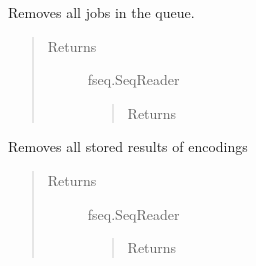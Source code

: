 \documentclass[letterpaper,10pt,english]{sphinxmanual}
\begin{document}
\begin{fulllineitems}
\begin{fulllineitems}
\end{fulllineitems}


\begin{fulllineitems}
\label{fseq.reading:fseq.reading.seq_reader.SeqReader.clearJobQueue}
Removes all jobs in the queue.
\begin{quote}\begin{description}
\item[{Returns}] \leavevmode
fseq.SeqReader
\begin{quote}

Returns 
\end{quote}

\end{description}\end{quote}

\end{fulllineitems}


\begin{fulllineitems}
\label{fseq.reading:fseq.reading.seq_reader.SeqReader.clearResults}
Removes all stored results of encodings
\begin{quote}\begin{description}
\item[{Returns}] \leavevmode
fseq.SeqReader
\begin{quote}

Returns 
\end{quote}

\end{description}\end{quote}

\end{fulllineitems}


\begin{fulllineitems}
\label{fseq.reading:fseq.reading.seq_reader.SeqReader.dataArrayConstructor}
\end{fulllineitems}



\end{fulllineitems}
\end{document}
